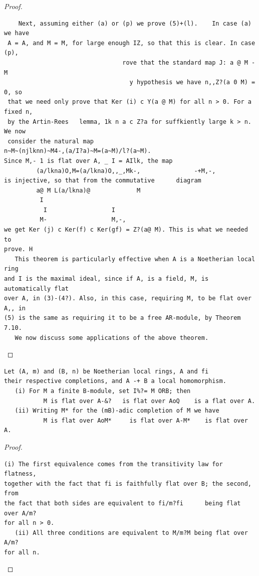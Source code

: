 \begin{proof}
\begin{verbatim}
    Next, assuming either (a) or (p) we prove (5)+(l).    In case (a) we have
 A = A, and M = M, for large enough IZ, so that this is clear. In case (p),
                                 rove that the standard map J: a @ M -      M
                                   y hypothesis we have n,,Z?(a 0 M) = 0, so
 that we need only prove that Ker (i) c Y(a @ M) for all n > 0. For a fixed n,
 by the Artin-Rees   lemma, 1k n a c Z?a for suffkiently large k > n. We now
 consider the natural map
n~M~(njlknn)~M4-,(a/I?a)~M=(a~M)/l?(a~M).
Since M,- 1 is flat over A, _ I = AIlk, the map
         (a/lkna)O,M=(a/lkna)O,,_,Mk-,               -+M,-,
is injective, so that from the commutative      diagram
         a@ M L(a/lkna)@             M
          I
           I                  I
          M-                  M,-,
we get Ker (j) c Ker(f) c Ker(gf) = Z?(a@ M). This is what we needed to
prove. H
   This theorem is particularly effective when A is a Noetherian local ring
and I is the maximal ideal, since if A, is a field, M, is automatically flat
over A, in (3)-(4?). Also, in this case, requiring M, to be flat over A,, in
(5) is the same as requiring it to be a free AR-module, by Theorem 7.10.
   We now discuss some applications of the above theorem.
\end{verbatim}
\end{proof}


\begin{theorem}\label{mcrt-auto-theorem-22-4}\uses{}
\begin{verbatim}
Let (A, m) and (B, n) be Noetherian local rings, A and fi
their respective completions, and A -+ B a local homomorphism.
   (i) For M a finite B-module, set I%?= M ORB; then
           M is flat over A-&?   is flat over AoQ    is a flat over A.
   (ii) Writing M* for the (mB)-adic completion of M we have
           M is flat over AoM*     is flat over A-M*    is flat over A.
\end{verbatim}
\end{theorem}
\begin{proof}
\begin{verbatim}
(i) The first equivalence comes from the transitivity law for flatness,
together with the fact that fi is faithfully flat over B; the second, from
the fact that both sides are equivalent to fi/m?fi      being flat over A/m?
for all n > 0.
   (ii) All three conditions are equivalent to M/m?M being flat over A/m?
for all n.
\end{verbatim}
\end{proof}


